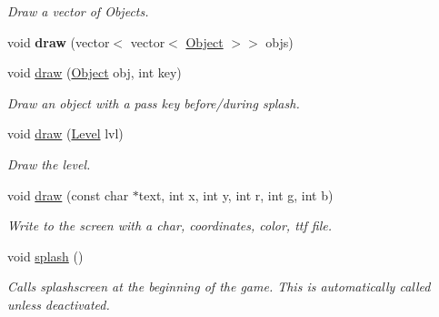 \begin{DoxyCompactItemize}
\begin{DoxyCompactList}\small\item\em Draw a vector of Objects. \end{DoxyCompactList}\item 
\mbox{\label{classEngine_afa41c75e3e6f47f5af9b7ad649d05564}} 
void {\bfseries draw} (vector$<$ vector$<$ \hyperlink{classObject}{Object} $>$$>$ objs)
\item 
\mbox{\label{classEngine_a81d89df09ee2577fd7deaf2f5e27f93a}} 
void \hyperlink{classEngine_a81d89df09ee2577fd7deaf2f5e27f93a}{draw} (\hyperlink{classObject}{Object} obj, int key)
\begin{DoxyCompactList}\small\item\em Draw an object with a pass key before/during splash. \end{DoxyCompactList}\item 
\mbox{\label{classEngine_a9435c9399f0d3952032c106e7ee8f6e9}} 
void \hyperlink{classEngine_a9435c9399f0d3952032c106e7ee8f6e9}{draw} (\hyperlink{classLevel}{Level} lvl)
\begin{DoxyCompactList}\small\item\em Draw the level. \end{DoxyCompactList}\item 
\mbox{\label{classEngine_acfa5f40b14195633d084fdb54deffcc9}} 
void \hyperlink{classEngine_acfa5f40b14195633d084fdb54deffcc9}{draw} (const char $\ast$text, int x, int y, int r, int g, int b)
\begin{DoxyCompactList}\small\item\em Write to the screen with a char, coordinates, color, ttf file. \end{DoxyCompactList}\item 
\mbox{\label{classEngine_adb6f1426c5c57f9d60be1e10d8eb2506}} 
void \hyperlink{classEngine_adb6f1426c5c57f9d60be1e10d8eb2506}{splash} ()
\begin{DoxyCompactList}\small\item\em Calls splashscreen at the beginning of the game. This is automatically called unless deactivated. \end{DoxyCompactList}\item 
\mbox{\label{classEngine_a3b9cf8a050f43e4e185748f7b2a3ded8}} 
$$
\end{DoxyCompactItemize}
